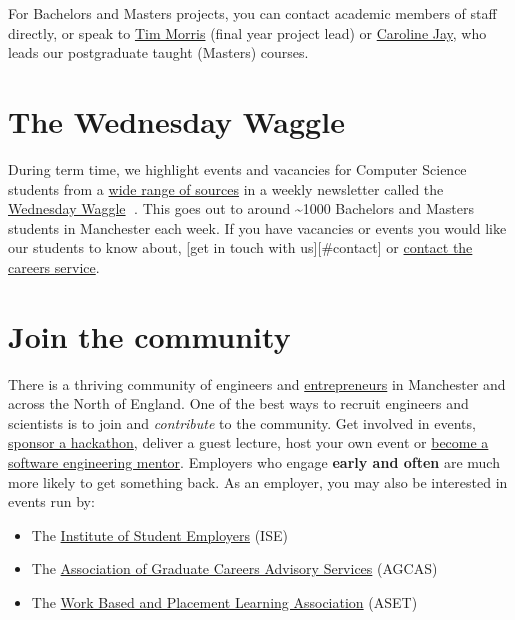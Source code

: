 \documentclass[
  12pt,
]{book}
\providecommand{\tightlist}{%
  \setlength{\itemsep}{0pt}\setlength{\parskip}{0pt}}
\begin{document}
For Bachelors and Masters projects, you can contact academic members of staff directly, or speak to \href{https://www.research.manchester.ac.uk/portal/tim.morris.html}{Tim Morris} (final year project lead) or \href{https://www.research.manchester.ac.uk/portal/caroline.jay.html}{Caroline Jay}, who leads our postgraduate taught (Masters) courses.

\hypertarget{the-wednesday-waggle}{%
\section{The Wednesday Waggle}\label{the-wednesday-waggle}}

During term time, we highlight events and vacancies for Computer Science students from a \href{http://dullhunk.github.io/where-can-I-look-for-jobs.html}{wide range of sources} in a weekly newsletter called the \href{https://waggle.cs.manchester.ac.uk/waggle/about}{Wednesday Waggle} 🐝. This goes out to around \textasciitilde1000 Bachelors and Masters students in Manchester each week. If you have vacancies or events you would like our students to know about, {[}get in touch with us{]}{[}\#contact{]} or \href{http://www.careers.manchester.ac.uk/aboutus/contact/}{contact the careers service}.

\hypertarget{join-the-community}{%
\section{Join the community}\label{join-the-community}}

There is a thriving community of engineers and \href{https://www.manchesterentrepreneurs.co.uk/}{entrepreneurs} in Manchester and across the North of England. One of the best ways to recruit engineers and scientists is to join and \emph{contribute} to the community. Get involved in events, \href{https://www.unicsmcr.com/}{sponsor a hackathon}, deliver a guest lecture, host your own event or \href{https://www.cs.manchester.ac.uk/connect/business-engagement/industrial-mentoring/}{become a software engineering mentor}. Employers who engage \textbf{early and often} are much more likely to get something back. As an employer, you may also be interested in events run by:

\begin{itemize}
\tightlist
\item
  The \href{https://ise.org.uk}{Institute of Student Employers} (ISE)
\item
  The \href{https://www.agcas.org.uk}{Association of Graduate Careers Advisory Services} (AGCAS)
\item
  The \href{https://www.asetonline.org}{Work Based and Placement Learning Association} (ASET)
\end{itemize}
\end{document}
